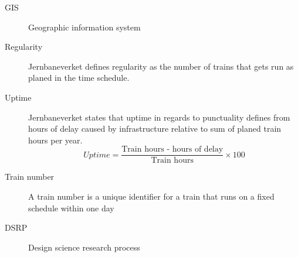 \label{sec:abbriv}
\vspace{5mm}

\begin{description}
\item [GIS] Geographic information system
\item [Regularity]	Jernbaneverket defines regularity as the number of trains that gets run as planed in the time schedule. 
\item [Uptime]	Jernbaneverket states that uptime in regards to punctuality defines from hours of delay caused by infrastructure relative to sum of planed train hours per year. \begin{equation} Uptime =
\frac{\text{Train hours - hours of delay}}{\text{Train hours}}\times 100 \end{equation}
\item [Train number] A train number is a unique identifier for a train that 
runs on a fixed schedule within one day
\item [DSRP] Design science research process
\end{description}


